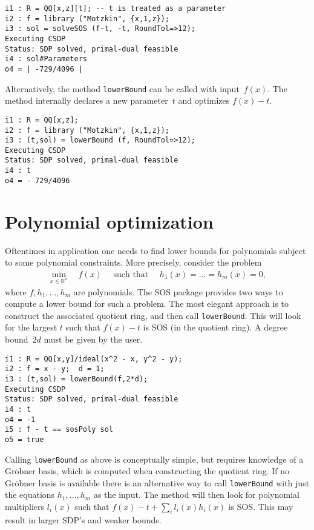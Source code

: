 \documentclass[11pt]{amsart}
\theoremstyle{plain}%
\theoremstyle{definition}
\theoremstyle{remark}
\newcommand{\SOS}{\textsc{SOS}\xspace}
\newcommand{\RR}{\mathbb{R}}
\begin{document}
{\small
\begin{verbatim}
i1 : R = QQ[x,z][t]; -- t is treated as a parameter
i2 : f = library ("Motzkin", {x,1,z});
i3 : sol = solveSOS (f-t, -t, RoundTol=>12);
Executing CSDP
Status: SDP solved, primal-dual feasible
i4 : sol#Parameters
o4 = | -729/4096 |
\end{verbatim}
}

\noindent
Alternatively, the method \verb|lowerBound| can be called with input~$f(x)$.
The method internally declares a new parameter~$t$ and optimizes $f(x)-t$.
{\small
\begin{verbatim}
i1 : R = QQ[x,z];
i2 : f = library ("Motzkin", {x,1,z});
i3 : (t,sol) = lowerBound (f, RoundTol=>12);
Executing CSDP
Status: SDP solved, primal-dual feasible
i4 : t
o4 = - 729/4096
\end{verbatim}
}

\section{Polynomial optimization}

Oftentimes in application one needs to find lower bounds for polynomials subject to some polynomial constraints.
More precisely, consider the problem
\begin{align*}
  \min_{x\in \RR^n} \quad f(x)
  \quad \text{ such that }\quad
  h_1(x)=\dots=h_m(x)=0,
\end{align*}
where $f, h_1,\dots,h_m$ are polynomials.
The \SOS package provides two ways to compute a lower bound for such a problem.
The most elegant approach is to construct the associated quotient ring, and then call \verb|lowerBound|.
This will look for the largest $t$ such that $f(x)-t$ is SOS (in the quotient ring).
A degree bound~$2d$ must be given by the user.

{\small
\begin{verbatim}
i1 : R = QQ[x,y]/ideal(x^2 - x, y^2 - y);
i2 : f = x - y;  d = 1;
i3 : (t,sol) = lowerBound(f,2*d);
Executing CSDP
Status: SDP solved, primal-dual feasible
i4 : t
o4 = -1
i5 : f - t == sosPoly sol
o5 = true
\end{verbatim}
}

Calling \verb|lowerBound| as above is conceptually simple, but requires knowledge of a Gröbner basis, which is computed when constructing the quotient ring.
If no Gröbner basis is available there is an alternative way to call \verb|lowerBound| with just the equations $h_1,\dots,h_m$ as the input.
The method will then look for polynomial multipliers $l_i(x)$ such that $f(x) - t + \sum_i l_i(x)h_i(x)$ is SOS.
This may result in larger SDP's and weaker bounds.
\end{document}
